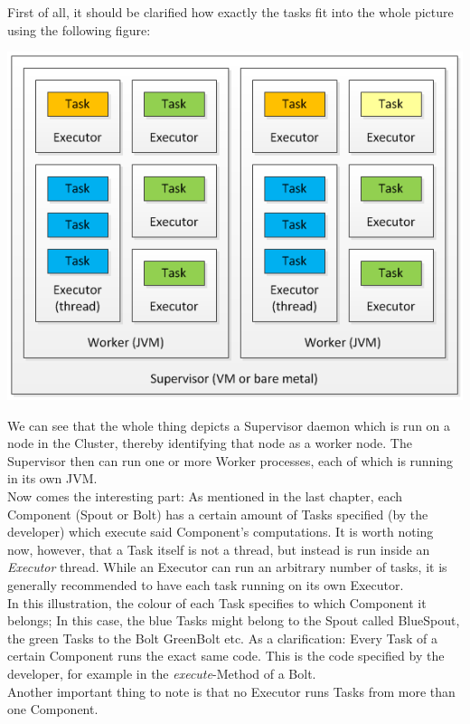 \documentclass[12pt,a4paper]{article}
\begin{document}
First of all, it should be clarified how exactly the tasks fit into the whole picture using the following figure:\\
\begin{center}
\includegraphics[scale=0.7]{images/Storm-Supervisors-Workers-Executors-Tasks.png}
\end{center}
We can see that the whole thing depicts a Supervisor daemon which is run on a node in the Cluster, thereby identifying that node as a worker node. The Supervisor then can run one or more Worker processes, each of which is running in its own JVM.\\
\indent Now comes the interesting part: As mentioned in the last chapter, each Component (Spout or Bolt) has a certain amount of Tasks specified (by the developer) which execute said Component's computations. It is worth noting now, however, that a Task itself is not a thread, but instead is run inside an \textit{Executor} thread. While an Executor can run an arbitrary number of tasks, it is generally recommended to have each task running on its own Executor.\\
\indent In this illustration, the colour of each Task specifies to which Component it belongs; In this case, the blue Tasks might belong to the Spout called BlueSpout, the green Tasks to the Bolt GreenBolt etc. As a clarification: Every Task of a certain Component runs the exact same code. This is the code specified by the developer, for example in the \textit{execute}-Method of a Bolt.\\
\indent Another important thing to note is that no Executor runs Tasks from more than one Component.
\end{document}
